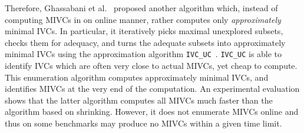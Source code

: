 Therefore, Ghassabani et al.~\cite{Ghass17AllIVCs} proposed another algorithm which, instead of computing MIVCs in on online manner,
rather computes only \emph{approximately} minimal IVCs. In particular, it iteratively picks maximal unexplored subsets, checks them for adequacy, and turns the adequate subsets into approximately minimal IVCs using the approximation algorithm \texttt{IVC\_UC}~\cite{Ghass16}. \texttt{IVC\_UC} is able to identify IVCs which are often very close to actual MIVCs, yet cheap to compute. This enumeration algorithm computes approximately minimal IVCs, and identifies MIVCs at the very end of the computation.  An experimental evaluation shows that the latter algorithm computes all MIVCs much faster than the algorithm based on shrinking. However, it does not enumerate MIVCs online and thus on some benchmarks may produce no MIVCs within a given time limit.

